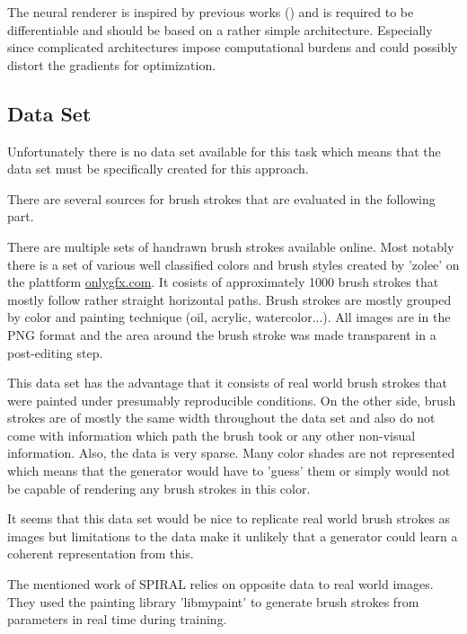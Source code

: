 The neural renderer is inspired by previous works () and 
is required to be differentiable and should be based on a rather simple architecture.
Especially since complicated architectures impose computational burdens and could
possibly distort the gradients for optimization.

\subsection{Data Set}

Unfortunately there is no data set available for this task which means that the data set
must be specifically created for this approach.

There are several sources for brush strokes that are evaluated in the following part.



There are multiple sets of handrawn brush strokes available online.
Most notably there is a set of various well classified colors and brush styles created
by 'zolee'  on the plattform \url{onlygfx.com}.
It cosists of approximately 1000 brush strokes that mostly follow rather straight
horizontal paths.
Brush strokes are mostly grouped by color and painting technique (oil, acrylic, watercolor...).
All images are in the PNG format and the area around the brush stroke was made 
transparent in a post-editing step.

This data set has the advantage that it consists of real world brush strokes that
were painted under presumably reproducible conditions.
On the other side, brush strokes are of mostly the same width throughout the data set
and also do not come with information which path the brush took or any other non-visual
information.
Also, the data is very sparse.
Many color shades are not represented which means that the generator would have to
'guess' them or simply would not be capable of rendering any brush strokes in this color.

It seems that this data set would be nice to replicate real world brush strokes
as images but limitations to the data make it unlikely that a generator could learn
a coherent representation from this.


The mentioned work of SPIRAL  relies on opposite data to real world
images.
They used the painting library 'libmypaint' \cite{libmypaint} to generate brush strokes
from parameters in real time during training.

